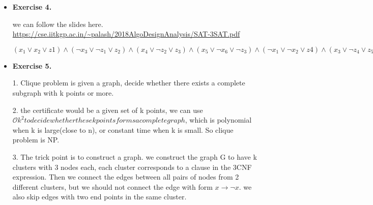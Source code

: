 \documentclass{article}
\newcommand{\bigO}{\mathcal{O}}
\begin{document}
\begin{itemize}
1.
\begin{algorithm}[H]  
    \caption{sum problem}  
    \begin{algorithmic}[1]  
        \Require  the number i which indicates the ith line
        \Ensure the sum of elements on the ith line
         {i}
            \State {}
        \Else
            \State \Return $3 \times POWER(i-1)$  
        \EndIf
        \EndFunction

        \Return POWER(i)
    \end{algorithmic}  
\end{algorithm}

2. it is obvious that we need n multiplication thus the time complexity is $\bigO (i)$. Correctness is proved by the definition of this triangle. The key is that all the elements contributes three times in the next layer. Assume the element in the middle to be $a_0$, the elements on the right are $a_1, a_2, ...$ and the elements on the left are $a_{-1}, a_{-2}, ...$ then $a_i$ will contribute to $a_{i-1}, a_{i}, a_{i+1}$ in the next layer.

\item \textbf{Exercise 4.}

we can follow the slides here. \url{https://cse.iitkgp.ac.in/~palash/2018AlgoDesignAnalysis/SAT-3SAT.pdf}

$(x_1\vee x_2\vee z1)\wedge (\neg x_3\vee \neg z_1\vee z_2)\wedge (x_4\vee \neg z_2\vee z_3)\wedge (x_5\vee \neg x_6\vee \neg z_3)\wedge (\neg x_1\vee \neg x_2\vee z4)\wedge (x_3\vee \neg z_4\vee z_5)\wedge (\neg x_4\vee \neg z_5\vee z_6)\wedge (x_5\vee x_6\vee \neg z_6)\wedge(x_1\vee \neg x_2\vee z7)\wedge (\neg x_3\vee \neg z_7\vee z_8)\wedge (x_4\vee \neg z_8\vee z_9)\wedge (x_5\vee \neg x_6\vee \neg z_9)\wedge (x_1\vee \neg x_2\vee z_{10})\wedge (x_1 \vee \neg x_2\vee \neg z_{10})$

\item \textbf{Exercise 5.}

1. Clique problem is given a graph, decide whether there exists a complete subgraph with k points or more.

2. the certificate would be a given set of k points, we can use $\bigO k^2 to decide whether these k points forms a complete graph$, which is polynomial when k is large(close to n), or constant time when k is small. So clique problem is NP.

3. The trick point is to construct a graph. we construct the graph G to have k clusters with 3 nodes each, each cluster corresponds to a clause in the 3CNF expression. Then we connect the edges between all pairs of nodes from 2 different clusters, but we should not connect the edge with form $x \to \neg x$. we also skip edges with two end points in the same cluster.


\end{itemize}
\end{document}
